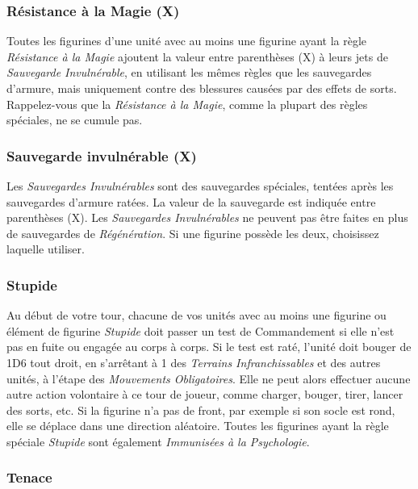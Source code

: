 \subsubsection*{Résistance à la Magie (X)}

Toutes les figurines d'une unité avec au moins une figurine ayant la règle \emph{Résistance à la Magie} ajoutent la valeur entre parenthèses (X) à leurs jets de \emph{Sauvegarde Invulnérable}, en utilisant les mêmes règles que les sauvegardes d'armure, mais uniquement contre des blessures causées par des effets de sorts. Rappelez-vous que la \emph{Résistance à la Magie}, comme la plupart des règles spéciales, ne se cumule pas.

\subsubsection*{Sauvegarde invulnérable (X)}

Les \emph{Sauvegardes Invulnérables} sont des sauvegardes spéciales, tentées après les sauvegardes d'armure ratées. La valeur de la sauvegarde est indiquée entre parenthèses (X). Les \emph{Sauvegardes Invulnérables} ne peuvent pas être faites en plus de sauvegardes de \emph{Régénération}. Si une figurine possède les deux, choisissez laquelle utiliser.

\subsubsection*{Stupide}

Au début de votre tour, chacune de vos unités avec au moins une figurine ou élément de figurine \emph{Stupide} doit passer un test de Commandement si elle n'est pas en fuite ou engagée au corps à corps. Si le test est raté, l'unité doit bouger de 1D6{\pouce} tout droit, en s'arrêtant à 1{\pouce} des \emph{Terrains Infranchissables} et des autres unités, à l'étape des \emph{Mouvements Obligatoires}. Elle ne peut alors effectuer aucune autre action volontaire à ce tour de joueur, comme charger, bouger, tirer, lancer des sorts, etc. Si la figurine n'a pas de front, par exemple si son socle est rond, elle se déplace dans une direction aléatoire. Toutes les figurines ayant la règle spéciale \emph{Stupide} sont également \emph{Immunisées à la Psychologie}.

\subsubsection*{Tenace}

